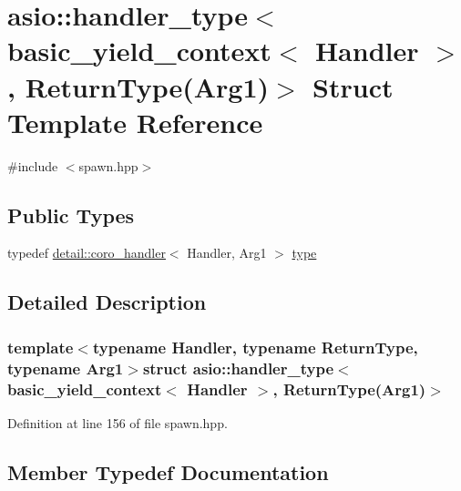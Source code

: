 \hypertarget{structasio_1_1handler__type_3_01basic__yield__context_3_01_handler_01_4_00_01_return_type_07_arg1_08_4}{}\section{asio\+:\+:handler\+\_\+type$<$ basic\+\_\+yield\+\_\+context$<$ Handler $>$, Return\+Type(Arg1)$>$ Struct Template Reference}
\label{structasio_1_1handler__type_3_01basic__yield__context_3_01_handler_01_4_00_01_return_type_07_arg1_08_4}


{\ttfamily \#include $<$spawn.\+hpp$>$}

\subsection*{Public Types}
\begin{DoxyCompactItemize}
\item 
typedef \hyperlink{classasio_1_1detail_1_1coro__handler}{detail\+::coro\+\_\+handler}$<$ Handler, Arg1 $>$ \hyperlink{structasio_1_1handler__type_3_01basic__yield__context_3_01_handler_01_4_00_01_return_type_07_arg1_08_4_a9c6d3bd9f6e0cbc667f5c8faa12328cc}{type}
\end{DoxyCompactItemize}


\subsection{Detailed Description}
\subsubsection*{template$<$typename Handler, typename Return\+Type, typename Arg1$>$struct asio\+::handler\+\_\+type$<$ basic\+\_\+yield\+\_\+context$<$ Handler $>$, Return\+Type(\+Arg1)$>$}



Definition at line 156 of file spawn.\+hpp.



\subsection{Member Typedef Documentation}
\hypertarget{structasio_1_1handler__type_3_01basic__yield__context_3_01_handler_01_4_00_01_return_type_07_arg1_08_4_a9c6d3bd9f6e0cbc667f5c8faa12328cc}{}
